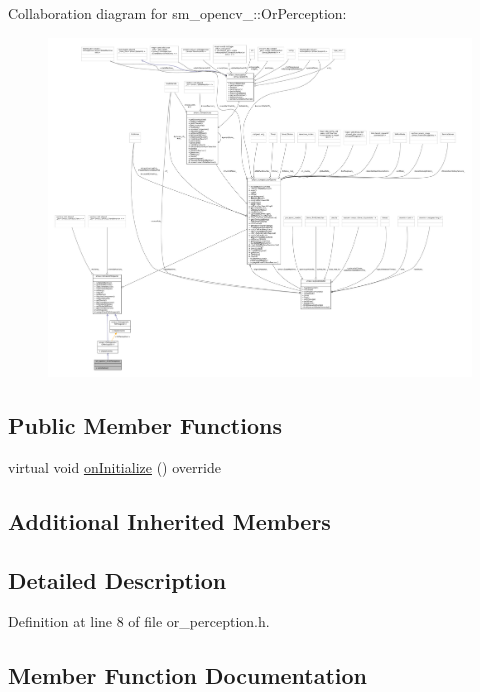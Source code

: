 Collaboration diagram for sm\+\_\+opencv\+\_\+:\+:Or\+Perception\+:
\nopagebreak
\begin{figure}[H]
\begin{center}
\leavevmode
\includegraphics[width=350pt]{classsm__opencv__3_1_1OrPerception__coll__graph}
\end{center}
\end{figure}
\subsection*{Public Member Functions}
\begin{DoxyCompactItemize}
\item 
virtual void \hyperlink{classsm__opencv__3_1_1OrPerception_a8b0cfe3b9fbdd604179e1bb8f4e743ef}{on\+Initialize} () override
\end{DoxyCompactItemize}
\subsection*{Additional Inherited Members}


\subsection{Detailed Description}


Definition at line 8 of file or\+\_\+perception.\+h.



\subsection{Member Function Documentation}
\mbox{\label{classsm__opencv__3_1_1OrPerception_a8b0cfe3b9fbdd604179e1bb8f4e743ef}} 
